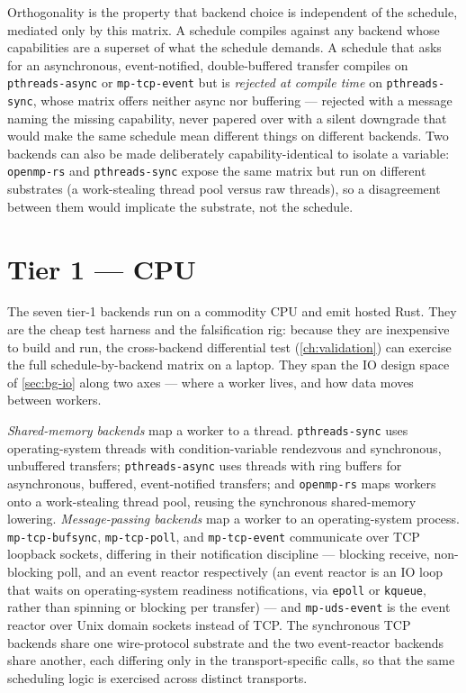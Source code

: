 

Orthogonality is the property that backend choice is independent of the schedule,
mediated only by this matrix. A schedule compiles against any backend whose
capabilities are a superset of what the schedule demands. A schedule that asks
for an asynchronous, event-notified, double-buffered transfer compiles on
\texttt{pthreads-async} or \texttt{mp-tcp-event} but is \emph{rejected at compile
time} on \texttt{pthreads-sync}, whose matrix offers neither async nor buffering
--- rejected with a message naming the missing capability, never papered over
with a silent downgrade that would make the same schedule mean different things on
different backends. Two backends can also be made deliberately capability-identical
to isolate a variable: \texttt{openmp-rs} and \texttt{pthreads-sync} expose the
same matrix but run on different substrates (a work-stealing thread pool versus
raw threads), so a disagreement between them would implicate the substrate, not
the schedule.

\section{Tier 1 --- CPU}\label{sec:be-tier1}

The seven tier-1 backends run on a commodity CPU and emit hosted Rust. They are
the cheap test harness and the falsification rig: because they are inexpensive to
build and run, the cross-backend differential test (\cref{ch:validation}) can
exercise the full schedule-by-backend matrix on a laptop. They span the IO
design space of \cref{sec:bg-io} along two axes --- where a worker lives, and how
data moves between workers.

\emph{Shared-memory backends} map a worker to a thread. \texttt{pthreads-sync}
uses operating-system threads with condition-variable rendezvous and synchronous,
unbuffered transfers; \texttt{pthreads-async} uses threads with ring buffers for
asynchronous, buffered, event-notified transfers; and \texttt{openmp-rs} maps
workers onto a work-stealing thread pool, reusing the synchronous shared-memory
lowering. \emph{Message-passing backends} map a worker to an operating-system
process. \texttt{mp-tcp-bufsync}, \texttt{mp-tcp-poll}, and \texttt{mp-tcp-event}
communicate over TCP loopback sockets, differing in their notification discipline
--- blocking receive, non-blocking poll, and an event reactor respectively (an
event reactor is an IO loop that waits on operating-system readiness
notifications, via \texttt{epoll} or \texttt{kqueue}, rather than spinning or
blocking per transfer) --- and \texttt{mp-uds-event} is the event reactor over
Unix domain sockets instead of TCP. The synchronous TCP backends share one wire-protocol substrate and the two
event-reactor backends share another, each differing only in the transport-specific
calls, so that the same scheduling logic is exercised across distinct transports.

